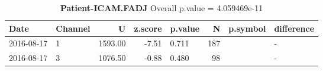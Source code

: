 \begin{table}[ht]
\caption[Patient-ICAM.FADJ]{\textbf{Patient-ICAM.FADJ} Overall p.value = 4.059469e-11 }
\centering
\begin{tabular}{llrrlrll}
  \hline
Date & Channel & U & z.score & p.value & N & p.symbol & difference \\ 
  \hline
2016-08-17 & 1 & 1593.00 & -7.51 & 0.711 & 187 &  & - \\ 
  2016-08-17 & 3 & 1076.50 & -0.88 & 0.480 &  98 &  & - \\ 
   \hline
\end{tabular}
\label{tab:patientICAM}
\end{table}

